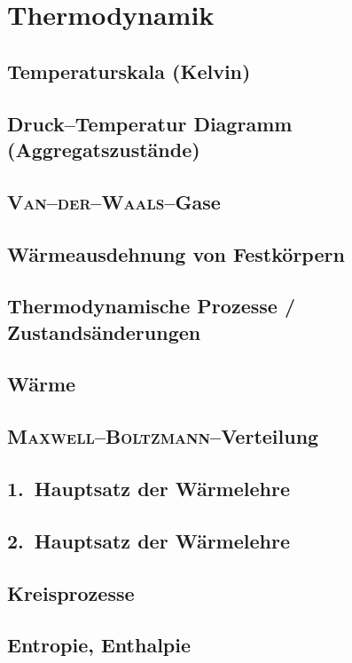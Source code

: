 \newpage
\section{Thermodynamik}
\subsection{Temperaturskala (Kelvin)}
\subsection{Druck--Temperatur Diagramm (Aggregatszustände)}
\subsection{\textsc{Van--der--Waals}--Gase}
\subsection{Wärmeausdehnung von Festkörpern}
\subsection{Thermodynamische Prozesse / Zustandsänderungen}
\subsection{Wärme}
\subsection{\textsc{Maxwell}--\textsc{Boltzmann}--Verteilung}
\subsection{1.\ Hauptsatz der Wärmelehre}
\subsection{2.\ Hauptsatz der Wärmelehre}
\subsection{Kreisprozesse}
\subsection{Entropie, Enthalpie}


